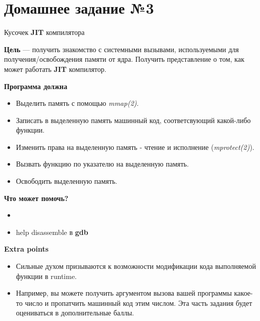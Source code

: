 \documentclass[../../lectures.tex]{subfiles}
\begin{document}
\section{Домашнее задание №3}
Кусочек \textbf{JIT} компилятора

\textbf{Цель} --- получить знакомство с системными вызывами, используемыми для получения/освобождения
памяти от ядра. Получить представление о том, как может работать \textbf{JIT} компилятор.

\textbf{Программа должна}
\begin{itemize}
    \item Выделить память с помощью \emph{mmap(2)}.
    \item Записать в выделенную память машинный код, соответсвующий какой-либо функции.
    \item Изменить права на выделенную память - чтение и исполнение (\emph{mprotect(2)}).
    \item Вызвать функцию по указателю на выделенную память.
    \item Освободить выделенную память.
\end{itemize}

\textbf{Что может помочь?}
\begin{itemize}
    \item {}
    \item help disassemble в \textbf{gdb}
\end{itemize}

\textbf{Extra points}
\begin{itemize}
    \item Сильные духом призываются к возможности модификации кода выполняемой функции
          в runtime. 
    \item Например, вы можете получить аргументом вызова вашей программы
          какое-то число и пропатчить машинный код этим числом. Эта часть задания будет
          оцениваться в дополнительные баллы.
\end{itemize}
\end{document}
